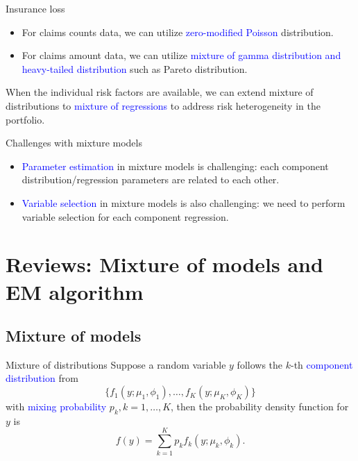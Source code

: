 \documentclass[professionalfont]{beamer}
\newcommand{\blue}[1]{\textcolor{blue}{#1}}
\begin{document}
\begin{frame}{Insurance loss}
	
	\begin{itemize}
		\item For claims counts data, we can utilize \blue{zero-modified Poisson} distribution.
		\item For claims amount data, we can utilize \blue{mixture of gamma distribution and heavy-tailed distribution} such as Pareto distribution.
	\end{itemize}
	When the individual risk factors are available, we can extend mixture of distributions to \blue{mixture of regressions} to address  risk heterogeneity in the portfolio.
\end{frame}

\begin{frame}{Challenges with mixture models}
	
	
	
	\begin{itemize}
		\item \blue{Parameter estimation} in mixture models is challenging: each {component distribution/regression} parameters are related to each other. 
		\item \blue{Variable selection} in mixture models is also challenging: 
		we need to perform variable selection for each component regression. 
	\end{itemize}
	\end{frame}



 \section{Reviews: Mixture of models and EM algorithm}
 \subsection{Mixture of models}
 
 \begin{frame}{Mixture of distributions}
Suppose a random variable $y$ follows the $k$-th \blue{component distribution} from  
$$\{f_1(y;\mu_1,\phi_1),\ldots,f_K(y;\mu_K,\phi_K)\}$$
with \blue{mixing probability} $p_k, k=1,\ldots,K$,
then the probability density function for $y$ is
$$f(y)=\sum_{k=1}^Kp_kf_k(y;\mu_k,\phi_k).$$
\end{frame}
\end{document}
